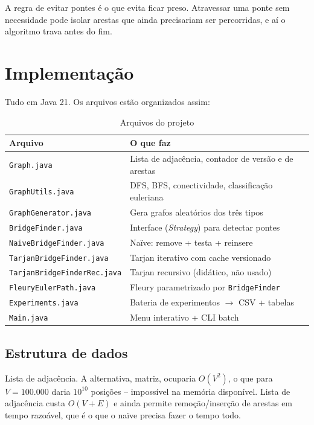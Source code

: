 \documentclass[a4paper,11pt]{article}
\begin{document}
A regra de evitar pontes é o que evita ficar preso. Atravessar uma ponte sem necessidade pode isolar arestas que ainda precisariam ser percorridas, e aí o algoritmo trava antes do fim.

\section{Implementação}

Tudo em Java 21. Os arquivos estão organizados assim:

\begin{table}[h]
\centering
\caption{Arquivos do projeto}
\small
\begin{tabular}{ll}
\toprule
Arquivo & O que faz \\
\midrule
\texttt{Graph.java}                 & Lista de adjacência, contador de versão e de arestas \\
\texttt{GraphUtils.java}            & DFS, BFS, conectividade, classificação euleriana \\
\texttt{GraphGenerator.java}        & Gera grafos aleatórios dos três tipos \\
\texttt{BridgeFinder.java}          & Interface (\textit{Strategy}) para detectar pontes \\
\texttt{NaiveBridgeFinder.java}     & Naïve: remove + testa + reinsere \\
\texttt{TarjanBridgeFinder.java}    & Tarjan iterativo com cache versionado \\
\texttt{TarjanBridgeFinderRec.java} & Tarjan recursivo (didático, não usado) \\
\texttt{FleuryEulerPath.java}       & Fleury parametrizado por \texttt{BridgeFinder} \\
\texttt{Experiments.java}           & Bateria de experimentos $\rightarrow$ CSV + tabelas \\
\texttt{Main.java}                  & Menu interativo + CLI batch \\
\bottomrule
\end{tabular}
\end{table}

\subsection{Estrutura de dados}

Lista de adjacência. A alternativa, matriz, ocuparia $O(V^2)$, o que para $V=100.000$ daria $10^{10}$ posições -- impossível na memória disponível. Lista de adjacência custa $O(V+E)$ e ainda permite remoção/inserção de arestas em tempo razoável, que é o que o naïve precisa fazer o tempo todo.
\end{document}
